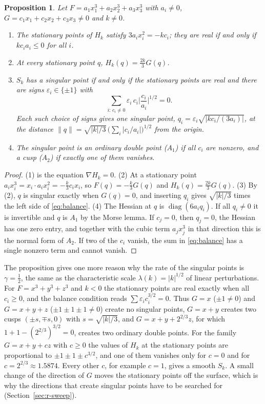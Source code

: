 \documentclass[12pt, a4paper, oneside]{book}
\theoremstyle{plain}
\newtheorem{proposition}[theorem]{Proposition}
\theoremstyle{definition}
\theoremstyle{remark}
\theoremstyle{definition}
\begin{document}
\begin{proposition}
\label{prop:linear}
Let $F=a_1x_1^3+a_2x_2^3+a_3x_3^3$ with $a_i\neq0$, $G=c_1x_1+c_2x_2+c_3x_3\neq0$ and $k\neq0$.
\begin{enumerate}
    \item The stationary points of $H_k$ satisfy $3a_ix_i^2=-kc_i$; they are real if and only if $kc_ia_i\le0$ for all $i$.
    \item At every stationary point $q$, $H_k(q)=\frac{2k}{3}G(q)$.
    \item $S_k$ has a singular point if and only if the stationary points are real and there are signs $\varepsilon_i\in\{\pm1\}$ with
          \begin{equation}
          \label{eq:balance}
          \sum_{i:\,c_i\neq0}\varepsilon_i\,c_i\Big|\frac{c_i}{a_i}\Big|^{1/2}=0 .
          \end{equation}
          Each such choice of signs gives one singular point, $q_i=\varepsilon_i\sqrt{|kc_i/(3a_i)|}$, at the distance $\|q\|=\sqrt{|k|/3}\,\big(\sum_i|c_i/a_i|\big)^{1/2}$ from the origin.
    \item The singular point is an ordinary double point ($A_1$) if all $c_i$ are nonzero, and a cusp ($A_2$) if exactly one of them vanishes.
\end{enumerate}
\end{proposition}

\begin{proof}
(1) is the equation $\nabla H_k=0$. (2) At a stationary point $a_ix_i^3=x_i\cdot a_ix_i^2=-\frac k3c_ix_i$, so $F(q)=-\frac k3G(q)$ and $H_k(q)=\frac{2k}{3}G(q)$. (3) By (2), $q$ is singular exactly when $G(q)=0$, and inserting $q_i$ gives $\sqrt{|k|/3}$ times the left side of \eqref{eq:balance}. (4) The Hessian at $q$ is $\operatorname{diag}(6a_iq_i)$. If all $q_i\neq0$ it is invertible and $q$ is $A_1$ by the Morse lemma. If $c_j=0$, then $q_j=0$, the Hessian has one zero entry, and together with the cubic term $a_jx_j^3$ in that direction this is the normal form of $A_2$. If two of the $c_i$ vanish, the sum in \eqref{eq:balance} has a single nonzero term and cannot vanish.
\end{proof}

The proposition gives one more reason why the rate of the singular points is $\gamma=\frac12$, the same as the characteristic scale $\lambda(k)=|k|^{1/2}$ of linear perturbations. For $F=x^3+y^3+z^3$ and $k<0$ the stationary points are real exactly when all $c_i\ge0$, and the balance condition reads $\sum\varepsilon_ic_i^{3/2}=0$. Thus $G=x$ ($\pm1\neq0$) and $G=x+y+z$ ($\pm1\pm1\pm1\neq0$) create no singular points, $G=x+y$ creates two cusps $(\pm s,\mp s,0)$ with $s=\sqrt{|k|/3}$, and $G=x+y+2^{2/3}z$, for which $1+1-(2^{2/3})^{3/2}=0$, creates two ordinary double points. For the family $G=x+y+cz$ with $c\ge0$ the values of $H_k$ at the stationary points are proportional to $\pm1\pm1\pm c^{3/2}$, and one of them vanishes only for $c=0$ and for $c=2^{2/3}\approx1.5874$. Every other $c$, for example $c=1$, gives a smooth $S_k$. A small change of the direction of $G$ moves the stationary points off the surface, which is why the directions that create singular points have to be searched for (Section~\ref{sec:r-sweep}).
\end{document}
